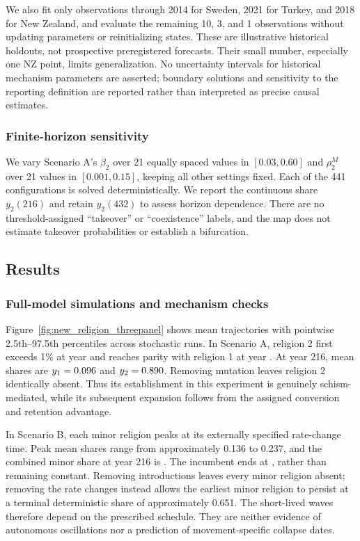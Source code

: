 \documentclass[11pt,a4paper]{article}
\begin{document}
We also fit only observations through 2014 for Sweden, 2021 for Turkey, and 2018 for New Zealand, and evaluate the remaining 10, 3, and 1 observations without updating parameters or reinitializing states. These are illustrative historical holdouts, not prospective preregistered forecasts. Their small number, especially one NZ point, limits generalization. No uncertainty intervals for historical mechanism parameters are asserted; boundary solutions and sensitivity to the reporting definition are reported rather than interpreted as precise causal estimates.

\subsubsection{Finite-horizon sensitivity}
\label{subsec:heatmap}
We vary Scenario A's $\beta_2$ over 21 equally spaced values in $[0.03,0.60]$ and $\rho_2^M$ over 21 values in $[0.001,0.15]$, keeping all other settings fixed. Each of the 441 configurations is solved deterministically. We report the continuous share $y_2(216)$ and retain $y_2(432)$ to assess horizon dependence. There are no threshold-assigned ``takeover'' or ``coexistence'' labels, and the map does not estimate takeover probabilities or establish a bifurcation.

\subsection{Results}
\label{sec:results}
\subsubsection{Full-model simulations and mechanism checks}
Figure~\ref{fig:new_religion_threepanel} shows mean trajectories with pointwise 2.5th--97.5th percentiles across stochastic runs. In Scenario A, religion 2 first exceeds 1\% at year \AOnePercent{} and reaches parity with religion 1 at year \AParity{}. At year 216, mean shares are $y_1=0.096$ and $y_2=0.890$. Removing mutation leaves religion 2 identically absent. Thus its establishment in this experiment is genuinely schism-mediated, while its subsequent expansion follows from the assigned conversion and retention advantage.

In Scenario B, each minor religion peaks at its externally specified rate-change time. Peak mean shares range from approximately 0.136 to 0.237, and the combined minor share at year 216 is \BFinalMinor{}. The incumbent ends at \BFinalIncumbent{}, rather than remaining constant. Removing introductions leaves every minor religion absent; removing the rate changes instead allows the earliest minor religion to persist at a terminal deterministic share of approximately 0.651. The short-lived waves therefore depend on the prescribed schedule. They are neither evidence of autonomous oscillations nor a prediction of movement-specific collapse dates.
\end{document}
